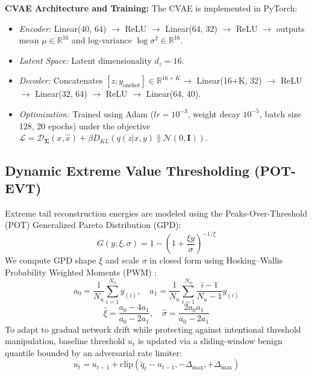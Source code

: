 \documentclass[10pt,journal,compsoc]{IEEEtran}
\begin{document}
\textbf{CVAE Architecture and Training:}
The CVAE is implemented in PyTorch:
\begin{itemize}
    \item \textit{Encoder:} Linear(40, 64) $\to$ ReLU $\to$ Linear(64, 32) $\to$ ReLU $\to$ outputs mean $\mu \in \mathbb{R}^{16}$ and log-variance $\log \sigma^2 \in \mathbb{R}^{16}$.
    \item \textit{Latent Space:} Latent dimensionality $d_z = 16$.
    \item \textit{Decoder:} Concatenates $[z; y_{\text{onehot}}] \in \mathbb{R}^{16 + K} \to$ Linear(16+K, 32) $\to$ ReLU $\to$ Linear(32, 64) $\to$ ReLU $\to$ Linear(64, 40).
    \item \textit{Optimization:} Trained using Adam ($lr = 10^{-3}$, weight decay $10^{-5}$, batch size 128, 20 epochs) under the objective $\mathcal{L} = \mathcal{D}_{\mathbf{\Sigma}}(x, \hat{x}) + \beta D_{KL}(q(z|x,y) \parallel \mathcal{N}(0, \mathbf{I}))$.
\end{itemize}

\subsection{Dynamic Extreme Value Thresholding (POT-EVT)}
Extreme tail reconstruction energies are modeled using the Peaks-Over-Threshold (POT) Generalized Pareto Distribution (GPD):
\begin{equation}
G(y; \xi, \sigma) = 1 - \left( 1 + \frac{\xi y}{\sigma} \right)^{-1/\xi}
\end{equation}
We compute GPD shape $\xi$ and scale $\sigma$ in closed form using Hosking--Wallis Probability Weighted Moments (PWM) \cite{hosking1987parameter}:
\begin{equation}
a_0 = \frac{1}{N_u} \sum_{i=1}^{N_u} y_{(i)}, \quad a_1 = \frac{1}{N_u} \sum_{i=1}^{N_u} \frac{i-1}{N_u-1} y_{(i)}
\end{equation}
\begin{equation}
\hat{\xi} = \frac{a_0 - 4 a_1}{a_0 - 2 a_1}, \quad \hat{\sigma} = \frac{2 a_0 a_1}{a_0 - 2 a_1}
\end{equation}
To adapt to gradual network drift while protecting against intentional threshold manipulation, baseline threshold $u_t$ is updated via a sliding-window benign quantile bounded by an adversarial rate limiter:
\begin{equation}
u_t = u_{t-1} + \text{clip}\left( \tilde{q}_t - u_{t-1}, -\Delta_{\max}, +\Delta_{\max} \right)
\end{equation}
\end{document}

